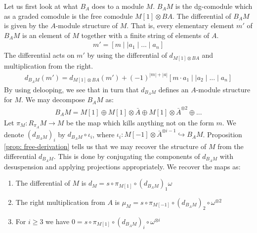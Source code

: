 \documentclass[../thesis.tex]{subfiles}
\begin{document}
            Let us first look at what $B_A$ does to a module $M$. $B_AM$ is the dg-comodule which as a graded comodule is the free comodule $M[1] \otimes BA$. The differential of $B_AM$ is given by the $A$-module structure of $M$. That is, every elementary element $m'$ of $B_AM$ is an element of $M$ together with a finite string of elements of $A$.
            \begin{align*}
                m' = [ m \mid\mid a_1 \mid ... \mid a_n]
            \end{align*}
            The differential acts on $m'$ by using the differential of $d_{M[1]\otimes BA}$ and multiplication from the right.
            \begin{align*}
                d_{B_AM}(m') = d_{M[1]\otimes BA}(m') + (-1)^{|m|+|a|} [m\cdot a_1 \mid\mid a_2 \mid ... \mid a_n]
            \end{align*}
            By using delooping, we see that in turn that $d_{B_AM}$ defines an $A$-module structure for $M$. We may decompose $B_AM$ as:
            \begin{align*}
                B_AM = M[1] \oplus M[1] \otimes \bar{A} \oplus M[1] \otimes \bar{A}^{\otimes 2} \oplus ...
            \end{align*}
            Let $\pi_M : R_{\pi_A}M \rightarrow M$ be the map which kills anything not on the form $m$. We denote $(d_{B_AM})_i$ by $d_{B_AM} \circ \iota_i$, where $\iota_i : M[-1] \otimes \bar{A}^{\otimes i-1} \hookrightarrow B_AM$. Proposition \ref{prop: free-derivation} tells us that we may recover the structure of $M$ from the differential $d_{B_AM}$. This is done by conjugating the components of $d_{B_AM}$ with desuspension and applying projections appropriately. We recover the maps as:
            \begin{enumerate}
                \item The differential of $M$ is $d_M = s \circ \pi_{M[1]} \circ (d_{B_AM})_1 \omega$
                \item The right multiplication from $A$ is $\mu_M = s\circ \pi_{M[-1]} \circ (d_{B_AM})_2 \circ \omega^{\otimes 2}$
                \item For $i \geq 3$ we have $0 = s \circ \pi_{M[1]} \circ (d_{B_AM})_i \circ \omega^{\otimes i}$
            \end{enumerate}
\end{document}
